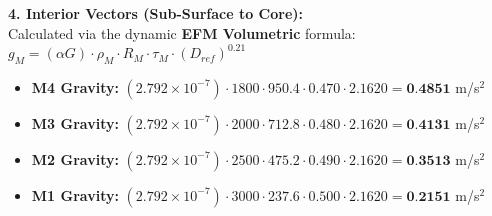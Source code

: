 \documentclass[11pt, a4paper]{article}
\begin{document}
  \vspace{0.5em}
  \noindent \textbf{4. Interior Vectors (Sub-Surface to Core):} \\[0.5em]
  \hspace*{1em} Calculated via the dynamic \textbf{EFM Volumetric} formula: $g_M = (\alpha G) \cdot \rho_{M} \cdot R_M \cdot \tau_M \cdot (D_{ref})^{0.21}$
  \begin{itemize}
    \item \textbf{M4 Gravity:} $(2.792 \times 10^{-7}) \cdot 1800 \cdot 950.4 \cdot 0.470 \cdot 2.1620 = \textbf{0.4851}$ m/s$^2$
    \item \textbf{M3 Gravity:} $(2.792 \times 10^{-7}) \cdot 2000 \cdot 712.8 \cdot 0.480 \cdot 2.1620 = \textbf{0.4131}$ m/s$^2$
    \item \textbf{M2 Gravity:} $(2.792 \times 10^{-7}) \cdot 2500 \cdot 475.2 \cdot 0.490 \cdot 2.1620 = \textbf{0.3513}$ m/s$^2$
    \item \textbf{M1 Gravity:} $(2.792 \times 10^{-7}) \cdot 3000 \cdot 237.6 \cdot 0.500 \cdot 2.1620 = \textbf{0.2151}$ m/s$^2$
  \end{itemize}
\end{document}
